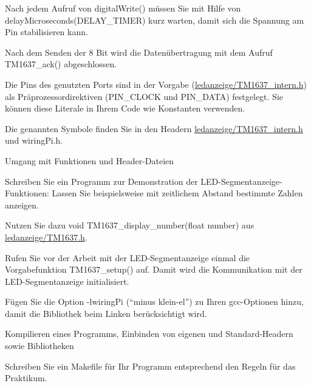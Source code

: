 Nach jedem Aufruf von digital\+Write() müssen Sie mit Hilfe von delay\+Microseconds(\+D\+E\+L\+A\+Y\+\_\+\+T\+I\+M\+E\+R) kurz warten, damit sich die Spannung am Pin stabilisieren kann.

Nach dem Senden der 8 Bit wird die Datenübertragung mit dem Aufruf T\+M1637\+\_\+ack() abgeschlossen.

Die Pins des genutzten Ports sind in der Vorgabe (\hyperlink{_t_m1637__intern_8h_source}{ledanzeige/\+T\+M1637\+\_\+intern.\+h}) als Präprozessordirektiven (P\+I\+N\+\_\+\+C\+L\+O\+CK und P\+I\+N\+\_\+\+D\+A\+TA) festgelegt. Sie können diese Literale in Ihrem Code wie Konstanten verwenden.

Die genannten Symbole finden Sie in den Headern \hyperlink{_t_m1637__intern_8h_source}{ledanzeige/\+T\+M1637\+\_\+intern.\+h} und wiring\+Pi.\+h.

Umgang mit Funktionen und Header-\/\+Dateien

Schreiben Sie ein Programm zur Demonstration der L\+E\+D-\/\+Segmentanzeige-\/\+Funktionen\+: Lassen Sie beispielsweise mit zeitlichem Abstand bestimmte Zahlen anzeigen.

Nutzen Sie dazu void T\+M1637\+\_\+display\+\_\+number(float number) aus \hyperlink{_t_m1637_8h_source}{ledanzeige/\+T\+M1637.\+h}.

Rufen Sie vor der Arbeit mit der L\+E\+D-\/\+Segmentanzeige einmal die Vorgabefunktion T\+M1637\+\_\+setup() auf. Damit wird die Kommunikation mit der L\+E\+D-\/\+Segmentanzeige initialisiert.

Fügen Sie die Option -\/lwiring\+Pi (“minus klein-\/el”) zu Ihren gcc-\/\+Optionen hinzu, damit die Bibliothek beim Linken berücksichtigt wird.

Kompilieren eines Programms, Einbinden von eigenen und Standard-\/\+Headern sowie Bibliotheken

Schreiben Sie ein Makefile für Ihr Programm entsprechend den Regeln für das Praktikum. 